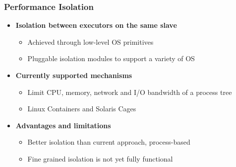 \begin{frame}
\frametitle{Performance Isolation}
\begin{itemize}
	\item {\bf Isolation between executors on the same slave}
	\begin{itemize}
		\item Achieved through low-level OS primitives
		\item Pluggable isolation modules to support a variety of OS
	\end{itemize}

\vspace{20pt}

	\item {\bf Currently supported mechanisms}
	\begin{itemize}
		\item Limit CPU, memory, network and I/O bandwidth of a process tree
		\item Linux Containers and Solaris Cages
	\end{itemize}

\vspace{20pt}

	\item {\bf Advantages and limitations}
	\begin{itemize}
		\item Better isolation than current approach, process-based
		\item Fine grained isolation is not yet fully functional
	\end{itemize}
\end{itemize}
\end{frame}

